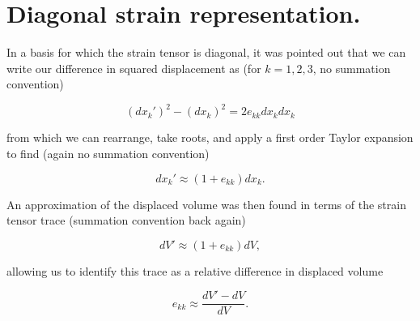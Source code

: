 % 
% 
% 
% 
% 
% 
% 
% 
% 
% 
% 
% 

\section{Diagonal strain representation.}

In a basis for which the strain tensor is diagonal, it was pointed out that we can write our difference in squared displacement as (for $k = 1, 2, 3$, no summation convention)

\begin{equation}\label{eqn:continuumElasticityReview:130}
(dx_k')^2 - (dx_k)^2 = 2 e_{kk} dx_k dx_k
\end{equation}

from which we can rearrange, take roots, and apply a first order Taylor expansion to find (again no summation convention)

\begin{equation}\label{eqn:continuumElasticityReview:150}
dx_k' \approx (1 + e_{kk}) dx_k.
\end{equation}

An approximation of the displaced volume was then found in terms of the strain tensor trace (summation convention back again)

\begin{equation}\label{eqn:continuumElasticityReview:170}
dV' \approx (1 + e_{kk}) dV,
\end{equation}

allowing us to identify this trace as a relative difference in displaced volume

\begin{equation}\label{eqn:continuumElasticityReview:190}
e_{kk} \approx \frac{dV' - dV}{dV}.
\end{equation}


